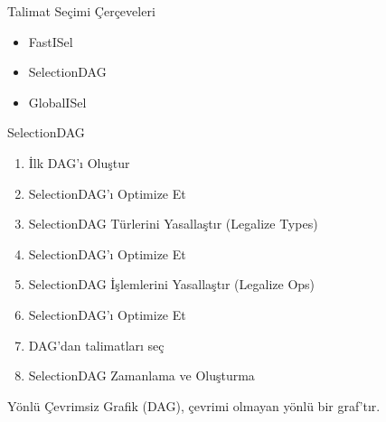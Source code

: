 \begin{frame}{Talimat Seçimi Çerçeveleri}
    \begin{itemize}
        \item FastISel
        \item SelectionDAG
        \item GlobalISel
    \end{itemize}
\end{frame}

\begin{frame}{SelectionDAG}
    \begin{enumerate}
    \item 
    İlk DAG'ı Oluştur
    \item
    SelectionDAG'ı Optimize Et
    \item
    SelectionDAG Türlerini Yasallaştır (Legalize Types)
    \item
    SelectionDAG'ı Optimize Et 
    \item
    SelectionDAG İşlemlerini Yasallaştır (Legalize Ops)
    \item
    SelectionDAG'ı Optimize Et
    \item
    DAG'dan talimatları seç
    \item
    SelectionDAG Zamanlama ve Oluşturma
    \end{enumerate}

	\begin{definition}
		\alert{Yönlü Çevrimsiz Grafik (DAG)}, çevrimi olmayan yönlü bir graf'tır.
	\end{definition}
\end{frame}
